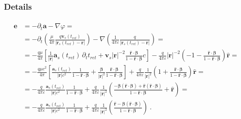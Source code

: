 \documentclass[letterpaper,10pt,english]{jupyterBook}
\begin{document}
\subsubsection*{Details}
\begin{equation*}
\begin{split}\begin{aligned}
  \mathbf{e} 
  & = - \partial_t \mathbf{a} - \nabla \varphi = \\
  & = - \partial_t \left( \frac{\mu}{4 \pi} \frac{q \mathbf{v}_s(t_{ret})}{|\mathbf{r}_s(t_{ret}) - \mathbf{r}|} \right) - \nabla \left( \frac{1}{4 \pi \varepsilon} \frac{q}{|\mathbf{r}_s(t_{ret}) - \mathbf{r}|}  \right) = \\
  & = - \frac{q \mu}{4 \pi} \left[ \frac{1}{|\mathbf{r}|} \mathbf{a}_s(t_{ret}) \, \partial_t t_{ret} + \mathbf{v}_s |\mathbf{r}|^{-2} \frac{\hat{\mathbf{r}} \cdot \boldsymbol\beta}{1 - \hat{\mathbf{r}} \cdot \boldsymbol\beta} c \right] - \frac{q}{4 \pi \varepsilon} |\mathbf{r}|^{-2} \left( - 1 - \frac{\hat{\mathbf{r}} \cdot \boldsymbol\beta}{1 - \hat{\mathbf{r}} \cdot \boldsymbol\beta} \right) \hat{\mathbf{r}} = \\
  & = - \frac{q \mu c^2}{4 \pi} \left[ \frac{\mathbf{a}_s(t_{ret})}{|\mathbf{r}| c^2} \frac{1}{1 - \hat{\mathbf{r}} \cdot \boldsymbol\beta}  + \frac{\boldsymbol\beta}{|\mathbf{r}|^2} \frac{\hat{\mathbf{r}} \cdot \boldsymbol\beta}{1 - \hat{\mathbf{r}} \cdot \boldsymbol\beta} \right] + \frac{q}{4 \pi \varepsilon} \frac{1}{|\mathbf{r}|^{2}} \left( 1 + \frac{\hat{\mathbf{r}} \cdot \boldsymbol\beta}{1 - \hat{\mathbf{r}} \cdot \boldsymbol\beta} \right) \hat{\mathbf{r}}= \\
  & = - \frac{q}{4 \pi \varepsilon} \frac{\mathbf{a}_s(t_{ret})}{|\mathbf{r}| c^2} \frac{1}{1 - \hat{\mathbf{r}} \cdot \boldsymbol\beta} + \frac{q}{4 \pi \varepsilon} \frac{1}{|\mathbf{r}|^2} \left( \frac{ -\boldsymbol\beta (\hat{\mathbf{r}} \cdot \boldsymbol\beta) + \hat{\mathbf{r}} (\hat{\mathbf{r}} \cdot \boldsymbol\beta) }{1 - \hat{\mathbf{r}} \cdot \boldsymbol\beta} + \hat{\mathbf{r}} \right) = \\
  & = - \frac{q}{4 \pi \varepsilon} \frac{\mathbf{a}_s(t_{ret})}{|\mathbf{r}| c^2} \frac{1}{1 - \hat{\mathbf{r}} \cdot \boldsymbol\beta} + \frac{q}{4 \pi \varepsilon} \frac{1}{|\mathbf{r}|^2} \left( \frac{ \hat{\mathbf{r}} - \boldsymbol\beta (\hat{\mathbf{r}} \cdot \boldsymbol\beta) }{1 - \hat{\mathbf{r}} \cdot \boldsymbol\beta} \right) \ .
\end{aligned}\end{split}
\end{equation*}\begin{equation*}

\end{equation*}
\end{document}
